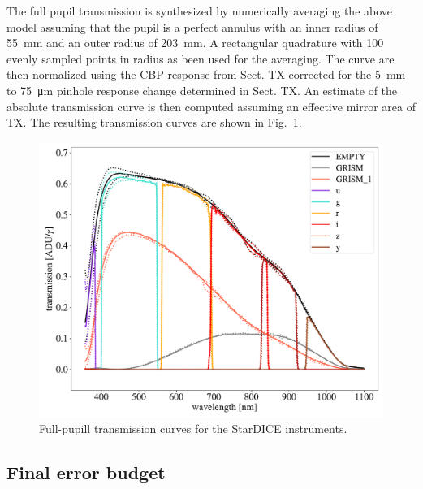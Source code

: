 The full pupil transmission is synthesized by numerically averaging
the above model assuming that the pupil is a perfect annulus with an
inner radius of \SI{55}{mm} and an outer radius of \SI{203}{mm}. A
rectangular quadrature with 100 evenly sampled points in radius as
been used for the averaging. The curve are then normalized using the
CBP response from Sect. TX corrected for the \SI{5}{mm} to \SI{75}{\micro\meter} pinhole
response change determined in Sect. TX. An estimate of the absolute
transmission curve is then computed assuming an effective mirror area
of TX. The resulting transmission curves are shown in
Fig.~\ref{fig:fullpupiltrans}.
\begin{figure}
  \centering
  \includegraphics[width=1\linewidth]{fig/fullpupill.pdf}
  \caption{Full-pupill transmission curves for the StarDICE instruments.}
  \label{fig:fullpupiltrans}
\end{figure}


\subsection{Final error budget}
